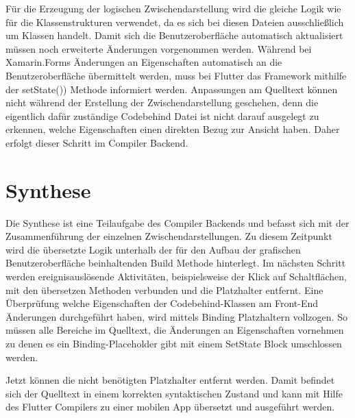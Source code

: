 Für die Erzeugung der logischen Zwischendarstellung wird die gleiche Logik wie für die Klassenstrukturen verwendet,  da es sich bei diesen Dateien ausschließlich um \Csharp Klassen handelt.  Damit sich die Benutzeroberfläche automatisch aktualisiert müssen noch erweiterte Änderungen vorgenommen werden.
Während bei Xamarin.Forms Änderungen an Eigenschaften automatisch an die Benutzeroberfläche 
übermittelt werden, muss bei Flutter das Framework mithilfe der setState()) Methode informiert 
werden.  Anpassungen am Quelltext können nicht während der Erstellung der Zwischendarstellung 
geschehen, denn die eigentlich dafür zuständige Codebehind Datei ist nicht darauf ausgelegt zu 
erkennen, welche Eigenschaften einen direkten Bezug zur Ansicht haben.  Daher erfolgt dieser Schritt im Compiler Backend.

\section{Synthese}

Die Synthese ist eine Teilaufgabe des Compiler Backends und befasst sich mit der Zusammenführung der einzelnen Zwischendarstellungen.  Zu diesem Zeitpunkt wird die übersetzte Logik unterhalb der für den Aufbau der grafischen Benutzeroberfläche beinhaltenden Build Methode hinterlegt.  Im nächsten Schritt werden ereignisauslösende Aktivitäten, beispielsweise der Klick auf Schaltflächen,  mit den übersetzen Methoden verbunden und die Platzhalter entfernt.  Eine Überprüfung welche Eigenschaften der Codebehind-Klassen am Front-End Änderungen durchgeführt haben, wird mittels Binding Platzhaltern vollzogen.  So müssen alle Bereiche im Quelltext, die Änderungen an Eigenschaften vornehmen zu denen es ein Binding-Placeholder gibt mit einem SetState Block umschlossen werden.


Jetzt können die nicht benötigten Platzhalter entfernt werden.  Damit befindet sich der Quelltext in einem korrekten syntaktischen Zustand und kann mit Hilfe des Flutter Compilers zu einer mobilen App übersetzt und ausgeführt werden. 


